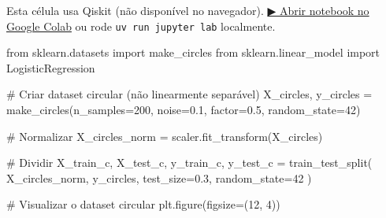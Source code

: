 \documentclass[
  brazilian,
]{report}
\newenvironment{Shaded}{\begin{snugshade}}{\end{snugshade}}
\newcommand{\CommentTok}[1]{\textcolor[rgb]{0.37,0.37,0.37}{#1}}
\newcommand{\DecValTok}[1]{\textcolor[rgb]{0.68,0.00,0.00}{#1}}
\newcommand{\FloatTok}[1]{\textcolor[rgb]{0.68,0.00,0.00}{#1}}
\newcommand{\ImportTok}[1]{\textcolor[rgb]{0.00,0.46,0.62}{#1}}
\newcommand{\NormalTok}[1]{\textcolor[rgb]{0.00,0.23,0.31}{#1}}
\newcommand{\OperatorTok}[1]{\textcolor[rgb]{0.37,0.37,0.37}{#1}}
\begin{document}
\begin{tcolorbox}[enhanced jigsaw, arc=.35mm, bottomrule=.15mm, bottomtitle=1mm, breakable, colback=white, colbacktitle=quarto-callout-warning-color!10!white, colframe=quarto-callout-warning-color-frame, coltitle=black, left=2mm, leftrule=.75mm, opacityback=0, opacitybacktitle=0.6, rightrule=.15mm, title=\textcolor{quarto-callout-warning-color}{\faExclamationTriangle}\hspace{0.5em}{⚛️ Célula Qiskit --- execute no Colab ou localmente}, titlerule=0mm, toprule=.15mm, toptitle=1mm]

Esta célula usa Qiskit (não disponível no navegador).
\href{https://colab.research.google.com/github/maxwellamaral/aula-quantum/blob/main/notebooks/20-quantum-machine-learning.ipynb}{▶
Abrir notebook no Google Colab} ou rode \texttt{uv\ run\ jupyter\ lab}
localmente.

\begin{Shaded}
\begin{Highlighting}[]

\ImportTok{from}\NormalTok{ sklearn.datasets }\ImportTok{import}\NormalTok{ make\_circles}
\ImportTok{from}\NormalTok{ sklearn.linear\_model }\ImportTok{import}\NormalTok{ LogisticRegression}

\CommentTok{\# Criar dataset circular (não linearmente separável)}
\NormalTok{X\_circles, y\_circles }\OperatorTok{=}\NormalTok{ make\_circles(n\_samples}\OperatorTok{=}\DecValTok{200}\NormalTok{, noise}\OperatorTok{=}\FloatTok{0.1}\NormalTok{, factor}\OperatorTok{=}\FloatTok{0.5}\NormalTok{, random\_state}\OperatorTok{=}\DecValTok{42}\NormalTok{)}

\CommentTok{\# Normalizar}
\NormalTok{X\_circles\_norm }\OperatorTok{=}\NormalTok{ scaler.fit\_transform(X\_circles)}

\CommentTok{\# Dividir}
\NormalTok{X\_train\_c, X\_test\_c, y\_train\_c, y\_test\_c }\OperatorTok{=}\NormalTok{ train\_test\_split(}
\NormalTok{    X\_circles\_norm, y\_circles, test\_size}\OperatorTok{=}\FloatTok{0.3}\NormalTok{, random\_state}\OperatorTok{=}\DecValTok{42}
\NormalTok{)}

\CommentTok{\# Visualizar o dataset circular}
\NormalTok{plt.figure(figsize}\OperatorTok{=}\NormalTok{(}\DecValTok{12}\NormalTok{, }\DecValTok{4}\NormalTok{))}


\end{Highlighting}
\end{Shaded}
\end{tcolorbox}
\end{document}
